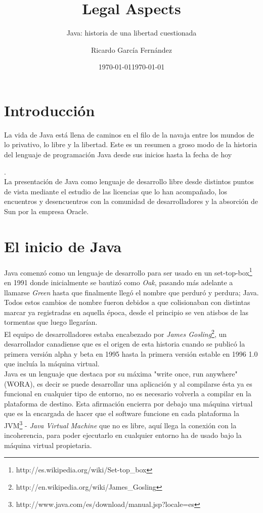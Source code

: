 \documentclass[11pt]{scrartcl}
\title{\textbf{Legal Aspects}}
\subtitle{Java: historia de una libertad cuestionada}
\author{Ricardo García Fernández}
\date{\today}
\begin{document}
\maketitle

\tableofcontents

\newpage

\section{Introducción}

La vida de Java está llena de caminos en el filo de la navaja entre los mundos de lo privativo, lo libre y la libertad. Este es un resumen a groso modo de la historia del lenguaje de programación Java desde sus inicios hasta la fecha de hoy \date{\today}.\\
La presentación de Java como lenguaje de desarrollo libre desde distintos puntos de vista mediante el estudio de las licencias que lo han acompañado, los encuentros y desencuentros con la comunidad de desarrolladores y la absorción de Sun por la empresa Oracle.

\section{El inicio de Java}

Java comenzó como un lenguaje de desarrollo para ser usado en un set-top-box\footnote{http://es.wikipedia.org/wiki/Set-top\_box} en 1991 donde inicialmente se bautizó como \emph{Oak}, pasando más adelante a llamarse \emph{Green} hasta que finalmente llegó el nombre que perduró y perdura; Java.
Todos estos cambios de nombre fueron debidos a que colisionaban con distintas marcar ya registradas en aquella época, desde el principio se ven atisbos de las tormentas que luego llegarían.\\
El equipo de desarrolladores estaba encabezado por \emph{James Gosling}\footnote{http://en.wikipedia.org/wiki/James\_Gosling}, un desarrollador canadiense que es el origen de esta historia cuando se publicó la primera versión alpha y beta en 1995 hasta la primera versión estable en 1996 1.0 que incluía la máquina virtual.\\
Java es un lenguaje que destaca por su máxima "write once, run anywhere" (WORA), es decir se puede desarrollar una aplicación y al compilarse ésta ya es funcional en cualquier tipo de entorno, no es necesario volverla a compilar en la plataforma de destino. Esta afirmación encierra por debajo una máquina virtual que es la encargada de hacer que el software funcione en cada plataforma la JVM\footnote{http://www.java.com/es/download/manual.jsp?locale=es} - \emph{Java Virtual Machine} que no es libre, aquí llega la conexión con la incoherencia, para poder ejecutarlo en cualquier entorno ha de usado bajo la máquina virtual propietaria.
\end{document}
